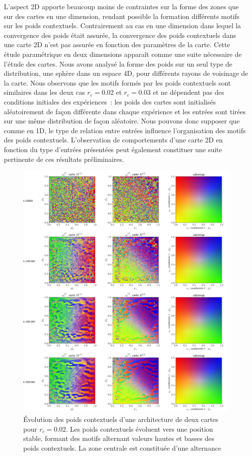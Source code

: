 \documentclass[../main]{subfiles}
\begin{document}
L'aspect 2D apporte beaucoup moins de contraintes sur la forme des zones que sur des cartes en une dimension, rendant possible la formation différents motifs sur les poids contextuels. 
Contrairement au cas en une dimension dans lequel la convergence des poids était assurée, la convergence des poids contextuels dans une carte 2D n'est pas assurée en fonction des paramètres de la carte. Cette étude paramétrique en deux dimensions apparaît comme une suite nécessaire de l'étude des cartes.
Nous avons analysé la forme des poids sur un seul type de distribution, une sphère dans un espace 4D, pour différents rayons de voisinage de la carte. Nous observons que les motifs formés par les poids contextuels sont similaires dans les deux cas $r_c = 0.02$ et $r_c = 0.03$ et ne dépendent pas des conditions initiales des expériences~: les poids des cartes sont initialisés aléatoirement de façon différente dans chaque expérience et les entrées sont tirées sur une même distribution de façon aléatoire.
Nous pouvons donc supposer que comme en 1D, le type de relation entre entrées influence l'organisation des motifs des poids contextuels. L'observation de comportements d'une carte 2D en fonction du type d'entrées présentées peut également constituer une suite pertinente de ces résultats préliminaires.

\begin{figure}[p]
	\includegraphics[width=\textwidth]{2SOM_sphere_rc002_evol.pdf}
	\caption{\'Evolution des poids contextuels d'une architecture de deux cartes pour $r_c =0.02$. Les poids contextuels évoluent vers une position stable, formant des motifs alternant valeurs hautes et basses des poids contextuels. La zone centrale est constituée d'une alternance  \label{fig:rc_002}}
\end{figure}
\end{document}
